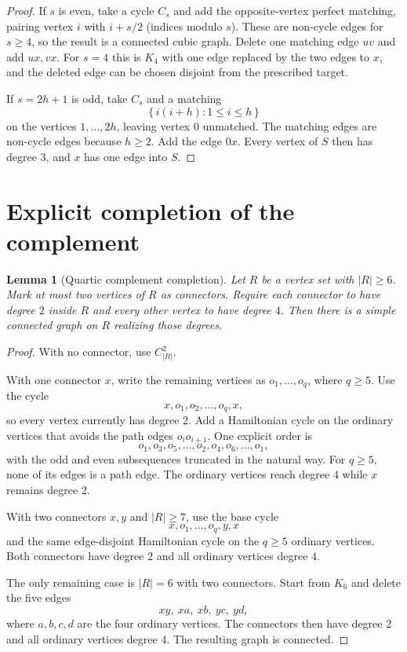 \documentclass[11pt]{article}
\newtheorem{lemma}{Lemma}
\theoremstyle{remark}
\begin{document}
\begin{proof}
If $s$ is even, take a cycle $C_s$ and add the opposite-vertex perfect matching,
pairing vertex $i$ with $i+s/2$ (indices modulo $s$).  These are non-cycle edges
for $s\ge4$, so the result is a connected cubic graph.  Delete one matching edge
$uv$ and add $ux,vx$.
For $s=4$ this is $K_4$ with one edge replaced by the two edges to $x$, and the
deleted edge can be chosen disjoint from the prescribed target.

If $s=2h+1$ is odd, take $C_s$ and a matching
\[
\{\, i(i+h): 1\le i\le h\,\}
\]
on the vertices $1,\ldots,2h$, leaving vertex $0$ unmatched.  The matching edges
are non-cycle edges because $h\ge2$.  Add the edge $0x$.  Every vertex of $S$
then has degree $3$, and $x$ has one edge into $S$.
\end{proof}

\section{Explicit completion of the complement}

\begin{lemma}[Quartic complement completion]
Let $R$ be a vertex set with $|R|\ge6$.  Mark at most two vertices of $R$ as
connectors.  Require each connector to have degree $2$ inside $R$ and every other
vertex to have degree $4$.  Then there is a simple connected graph on $R$ realizing
those degrees.
\end{lemma}

\begin{proof}
With no connector, use $C_{|R|}^2$.

With one connector $x$, write the remaining vertices as
$o_1,\ldots,o_q$, where $q\ge5$.  Use the cycle
\[
x,o_1,o_2,\ldots,o_q,x,
\]
so every vertex currently has degree $2$.  Add a Hamiltonian cycle on the ordinary
vertices that avoids the path edges $o_io_{i+1}$.  One explicit order is
\[
o_1,o_3,o_5,\ldots,o_2,o_4,o_6,\ldots,o_1,
\]
with the odd and even subsequences truncated in the natural way.  For $q\ge5$,
none of its edges is a path edge.  The ordinary vertices reach degree $4$ while
$x$ remains degree $2$.

With two connectors $x,y$ and $|R|\ge7$, use the base cycle
\[
x,o_1,\ldots,o_q,y,x
\]
and the same edge-disjoint Hamiltonian cycle on the $q\ge5$ ordinary vertices.
Both connectors have degree $2$ and all ordinary vertices degree $4$.

The only remaining case is $|R|=6$ with two connectors.  Start from $K_6$ and
delete the five edges
\[
xy,\ xa,\ xb,\ yc,\ yd,
\]
where $a,b,c,d$ are the four ordinary vertices.  The connectors then have degree
$2$ and all ordinary vertices degree $4$.  The resulting graph is connected.
\end{proof}
\end{document}
